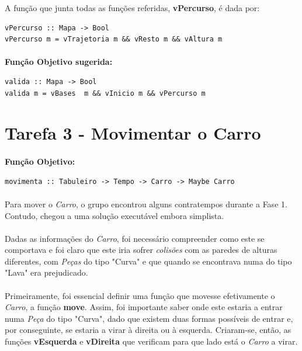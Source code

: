 \documentclass[12pt,a4paper]{report}
\begin{document}
A função que junta todas as funções referidas, \textbf{vPercurso}, é dada por:
 \begin{verbatim}
vPercurso :: Mapa -> Bool
vPercurso m = vTrajetoria m && vResto m && vAltura m
 \end{verbatim}

\paragraph{}\textbf{Função Objetivo sugerida:}

\begin{verbatim}
valida :: Mapa -> Bool
valida m = vBases  m && vInicio m && vPercurso m 
\end{verbatim}


\newpage
\section{Tarefa 3 - Movimentar o Carro}
\label{Tarefa3_2017li1g77}

\paragraph{}\textbf{Função Objetivo:}

\begin{verbatim}
movimenta :: Tabuleiro -> Tempo -> Carro -> Maybe Carro
\end{verbatim}

\paragraph{} Para mover o \textit{Carro}, o grupo encontrou alguns contratempos durante a Fase 1. Contudo, chegou a uma solução executável embora simplista.

\paragraph{} Dadas as informações do \textit{Carro}, foi necessário compreender como este se comportava e foi claro que este iria sofrer \textit{colisões} com as paredes de alturas diferentes, com \textit{Peças} do tipo "Curva" e que quando se encontrava numa do tipo "Lava" era prejudicado.

\paragraph{}Primeiramente, foi essencial definir uma função que movesse efetivamente o \textit{Carro}, a função \textbf{move}.
\newline Assim, foi importante saber onde este estaria a entrar numa \textit{Peça} do tipo "Curva", dado que existem duas formas possíveis de entrar e, por conseguinte, se estaria a virar à direita ou à esquerda. Criaram-se, então, as funções \textbf{vEsquerda} e \textbf{vDireita} que verificam para que lado está o \textit{Carro} a virar.
\end{document}
